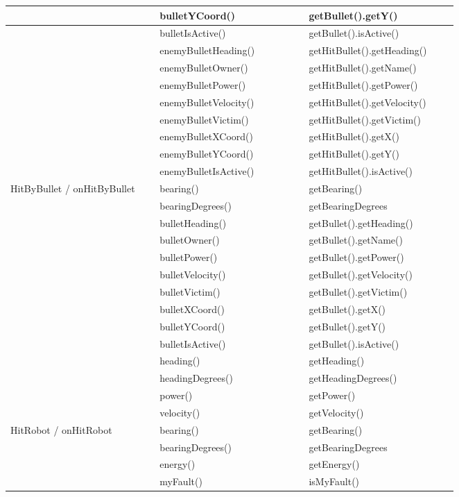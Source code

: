 \begin{center}
\begin{tabular}{ | p{0.3\linewidth} | p{0.3\linewidth} | p{0.3\linewidth} |}
		& bulletYCoord() & getBullet().getY() \\ \hline
		& bulletIsActive() & getBullet().isActive() \\ \hline
		& enemyBulletHeading() & getHitBullet().getHeading() \\ \hline
		& enemyBulletOwner() & getHitBullet().getName() \\ \hline
		& enemyBulletPower() & getHitBullet().getPower() \\ \hline
		& enemyBulletVelocity() & getHitBullet().getVelocity() \\ \hline
		& enemyBulletVictim() & getHitBullet().getVictim() \\ \hline
		& enemyBulletXCoord() & getHitBullet().getX() \\ \hline
		& enemyBulletYCoord() & getHitBullet().getY() \\ \hline
		& enemyBulletIsActive() & getHitBullet().isActive() \\ \hline
		HitByBullet / onHitByBullet& bearing() & getBearing() \\ \hline
		& bearingDegrees() & getBearingDegrees \\ \hline
		& bulletHeading() & getBullet().getHeading() \\ \hline
		& bulletOwner() & getBullet().getName() \\ \hline
		& bulletPower() & getBullet().getPower() \\ \hline
		& bulletVelocity() & getBullet().getVelocity() \\ \hline
		& bulletVictim() & getBullet().getVictim() \\ \hline
		& bulletXCoord() & getBullet().getX() \\ \hline
		& bulletYCoord() & getBullet().getY() \\ \hline
		& bulletIsActive() & getBullet().isActive() \\ \hline
		& heading() & getHeading() \\ \hline
		& headingDegrees() & getHeadingDegrees() \\ \hline
		& power() & getPower() \\ \hline
		& velocity() & getVelocity() \\ \hline
		HitRobot / onHitRobot & bearing() & getBearing() \\ \hline
		& bearingDegrees() & getBearingDegrees \\ \hline
		& energy() & getEnergy() \\ \hline
		& myFault() & isMyFault() \\ \hline

\end{tabular}
\end{center}
